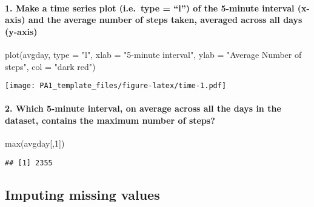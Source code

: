\documentclass[
]{article}
\newenvironment{Shaded}{\begin{snugshade}}{\end{snugshade}}
\newcommand{\AttributeTok}[1]{\textcolor[rgb]{0.77,0.63,0.00}{#1}}
\newcommand{\DecValTok}[1]{\textcolor[rgb]{0.00,0.00,0.81}{#1}}
\newcommand{\FunctionTok}[1]{\textcolor[rgb]{0.00,0.00,0.00}{#1}}
\newcommand{\NormalTok}[1]{#1}
\newcommand{\StringTok}[1]{\textcolor[rgb]{0.31,0.60,0.02}{#1}}
\begin{document}
\hypertarget{make-a-time-series-plot-i.e.-type-l-of-the-5-minute-interval-x-axis-and-the-average-number-of-steps-taken-averaged-across-all-days-y-axis}{%
\paragraph{1. Make a time series plot (i.e.~type = ``l'') of the
5-minute interval (x-axis) and the average number of steps taken,
averaged across all days
(y-axis)}\label{make-a-time-series-plot-i.e.-type-l-of-the-5-minute-interval-x-axis-and-the-average-number-of-steps-taken-averaged-across-all-days-y-axis}}

\begin{Shaded}
\begin{Highlighting}[]
\FunctionTok{plot}\NormalTok{(avgday, }\AttributeTok{type =} \StringTok{"l"}\NormalTok{, }\AttributeTok{xlab =} \StringTok{"5{-}minute interval"}\NormalTok{, }
     \AttributeTok{ylab =} \StringTok{"Average Number of steps"}\NormalTok{, }\AttributeTok{col =} \StringTok{"dark red"}\NormalTok{)}
\end{Highlighting}
\end{Shaded}

\texttt{[image: PA1\_template\_files/figure-latex/time-1.pdf]}

\hypertarget{which-5-minute-interval-on-average-across-all-the-days-in-the-dataset-contains-the-maximum-number-of-steps}{%
\paragraph{2. Which 5-minute interval, on average across all the days in
the dataset, contains the maximum number of
steps?}\label{which-5-minute-interval-on-average-across-all-the-days-in-the-dataset-contains-the-maximum-number-of-steps}}

\begin{Shaded}
\begin{Highlighting}[]
\FunctionTok{max}\NormalTok{(avgday[,}\DecValTok{1}\NormalTok{])}
\end{Highlighting}
\end{Shaded}

\begin{verbatim}
## [1] 2355
\end{verbatim}

\hypertarget{imputing-missing-values}{%
\subsection{Imputing missing values}\label{imputing-missing-values}}
\end{document}
